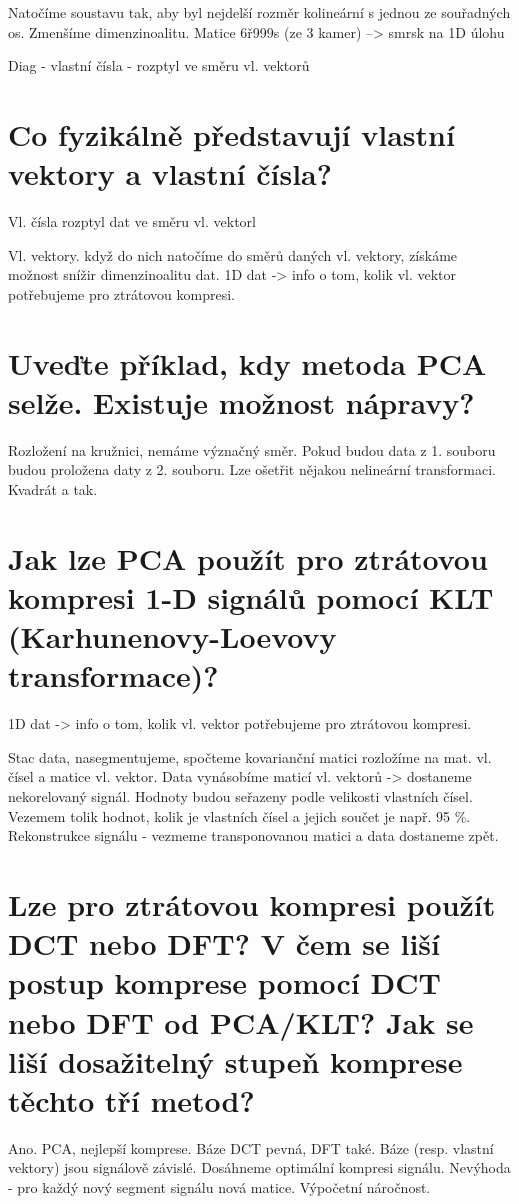 \documentclass[a4paper,12pt]{article}   %
\begin{document}
Natočíme soustavu tak, aby byl nejdelší rozměr kolineární s jednou ze souřadných os. Zmenšíme dimenzinoalitu. Matice 6ř999s (ze 3 kamer) --> smrsk na 1D úlohu

Diag - vlastní čísla - rozptyl ve směru vl. vektorů


\section{Co fyzikálně představují vlastní vektory a vlastní čísla?}
Vl. čísla rozptyl dat ve směru vl. vektorl

Vl. vektory. když do nich natočíme do směrů daných vl. vektory, získáme možnost snížir dimenzinoalitu dat. 1D dat -> info o tom, kolik vl. vektor potřebujeme pro ztrátovou kompresi. 



\section{Uveďte příklad, kdy metoda PCA selže. Existuje možnost nápravy?}

Rozložení na kružnici, nemáme význačný směr. Pokud budou data z 1. souboru budou proložena daty z 2. souboru. Lze ošetřit nějakou nelineární transformaci. Kvadrát a tak.

\section{Jak lze PCA použít pro ztrátovou kompresi 1-D signálů pomocí KLT (Karhunenovy-Loevovy transformace)?}

1D dat -> info o tom, kolik vl. vektor potřebujeme pro ztrátovou kompresi. 

Stac data, nasegmentujeme, spočteme kovarianční matici  rozložíme na mat. vl. čísel a matice vl. vektor. Data vynásobíme maticí vl. vektorů -> dostaneme nekorelovaný signál. Hodnoty budou seřazeny podle velikosti vlastních čísel. Vezemem tolik hodnot, kolik je vlastních čísel a jejich součet je např. 95 \%. Rekonstrukce signálu - vezmeme transponovanou matici a data dostaneme zpět.


\section{Lze pro ztrátovou kompresi použít DCT nebo DFT? V čem se liší postup komprese pomocí DCT nebo DFT od PCA/KLT? Jak se liší dosažitelný stupeň komprese těchto tří metod?}
Ano. PCA, nejlepší komprese. Báze DCT pevná, DFT také. Báze (resp. vlastní vektory) jsou signálově závislé. Dosáhneme optimální kompresi signálu. Nevýhoda - pro každý nový segment signálu nová matice. Výpočetní náročnost. 
\end{document}
